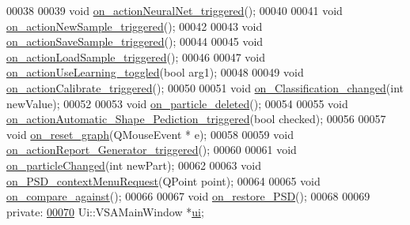 \begin{DoxyCode}
00038 
00039   \textcolor{keywordtype}{void} \hyperlink{class_v_s_a_main_window_a131d34b899c7b16b58ff317d77486529}{on\_actionNeuralNet\_triggered}();
00040 
00041   \textcolor{keywordtype}{void} \hyperlink{class_v_s_a_main_window_a671264c6cb0136f83fc24075545c8c0c}{on\_actionNewSample\_triggered}();
00042 
00043   \textcolor{keywordtype}{void} \hyperlink{class_v_s_a_main_window_a343178f350d9f2cb3067c75f995169f3}{on\_actionSaveSample\_triggered}();
00044 
00045   \textcolor{keywordtype}{void} \hyperlink{class_v_s_a_main_window_a09c50b7552a1636c01c4f2f2817a223c}{on\_actionLoadSample\_triggered}();
00046 
00047   \textcolor{keywordtype}{void} \hyperlink{class_v_s_a_main_window_ae995dc5e5832a1be3a77c36f7df5f982}{on\_actionUseLearning\_toggled}(\textcolor{keywordtype}{bool} arg1);
00048 
00049   \textcolor{keywordtype}{void} \hyperlink{class_v_s_a_main_window_a0051e5a6f9f17e898e962da6debb8d8b}{on\_actionCalibrate\_triggered}();
00050 
00051   \textcolor{keywordtype}{void} \hyperlink{class_v_s_a_main_window_af670cbc8db47377e395cadd2d4c59772}{on\_Classification\_changed}(\textcolor{keywordtype}{int} newValue);
00052 
00053   \textcolor{keywordtype}{void} \hyperlink{class_v_s_a_main_window_afb86baadff8bf9e00b4d487de68e5b80}{on\_particle\_deleted}();
00054 
00055   \textcolor{keywordtype}{void} \hyperlink{class_v_s_a_main_window_a5aa928cf40e92cd184f1f959b87d9acf}{on\_actionAutomatic\_Shape\_Pediction\_triggered}(\textcolor{keywordtype}{bool} 
      checked);
00056 
00057   \textcolor{keywordtype}{void} \hyperlink{class_v_s_a_main_window_ad7658d814c3f41b673ba3d888ef68b00}{on\_reset\_graph}(QMouseEvent * e);
00058 
00059   \textcolor{keywordtype}{void} \hyperlink{class_v_s_a_main_window_aaeec63d325c863eba2b1bce5e0eaa05e}{on\_actionReport\_Generator\_triggered}();
00060 
00061   \textcolor{keywordtype}{void} \hyperlink{class_v_s_a_main_window_a5fcffc892d83090533418aa159c11bf0}{on\_particleChanged}(\textcolor{keywordtype}{int} newPart);
00062 
00063   \textcolor{keywordtype}{void} \hyperlink{class_v_s_a_main_window_a8d9025970a6a3b27c1f83a92df6c1bad}{on\_PSD\_contextMenuRequest}(QPoint point);
00064 
00065   \textcolor{keywordtype}{void} \hyperlink{class_v_s_a_main_window_a26fbb5e4ad62a0aeef99b8ae23c0e85e}{on\_compare\_against}();
00066 
00067   \textcolor{keywordtype}{void} \hyperlink{class_v_s_a_main_window_ad336ffb25b343972e0dbd6d2584a492e}{on\_restore\_PSD}();
00068 
00069 \textcolor{keyword}{private}:
\hypertarget{vsamainwindow_8h_source_l00070}{}\hyperlink{class_v_s_a_main_window_a958a0581d2bf1bfe020c3b5d8f738640}{00070}   Ui::VSAMainWindow *\hyperlink{class_v_s_a_main_window_a958a0581d2bf1bfe020c3b5d8f738640}{ui};

\end{DoxyCode}
